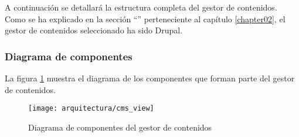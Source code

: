 A continuación se detallará la estructura completa del gestor de contenidos.  Como se ha explicado en la sección ``'' perteneciente al capítulo \ref{chapter02}, el gestor de contenidos seleccionado ha sido Drupal.


\subsubsection{Diagrama de componentes}
La figura \ref{fig:diagrama_componentes_cms} muestra el diagrama de los componentes que forman parte del gestor de contenidos.
\begin{landscape}
	\begin{figure}[ht]
		\centering
		\texttt{[image: arquitectura/cms\_view]}
		\caption{Diagrama de componentes del gestor de contenidos}
		\label{fig:diagrama_componentes_cms}
	\end{figure}
\end{landscape}


